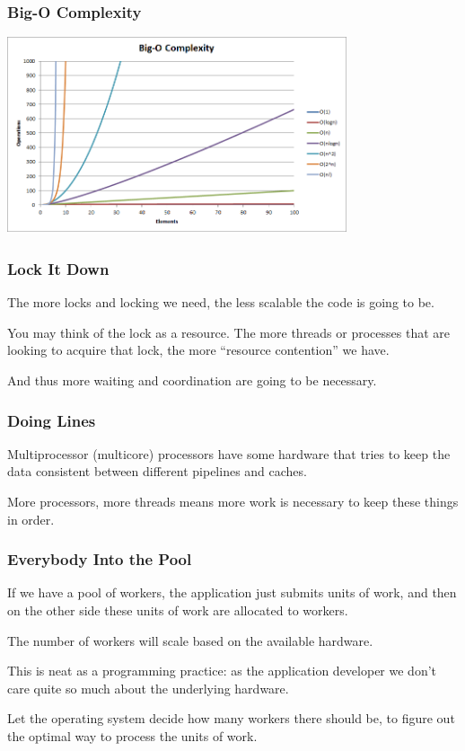 \begin{frame}
\frametitle{Big-O Complexity}
\begin{center}
	\includegraphics[width=0.75\textwidth]{images/big-o-complexity}
\end{center}

\end{frame}



\begin{frame}
\frametitle{Lock It Down}
The more locks and locking we need, the less scalable the code is going to be. 

You may think of the lock as a resource. 
The more threads or processes that are looking to acquire that lock, the more ``resource contention'' we have.

And thus more waiting and coordination are going to be necessary.

\end{frame}



\begin{frame}
\frametitle{Doing Lines}

Multiprocessor (multicore) processors have some hardware that tries to keep the data consistent between different pipelines and caches.

 More processors, more threads means more work is necessary to keep these things in order.

\end{frame}



\begin{frame}
\frametitle{Everybody Into the Pool}

If we have a pool of workers, the application just submits units of work, and then on the other side these units of work are allocated to workers. 

The number of workers will scale based on the available hardware. 

This is neat as a programming practice: as the application developer we don't care quite so much about the underlying hardware. 

Let the operating system decide how many workers there should be, to figure out the optimal way to process the units of work.

\end{frame}



